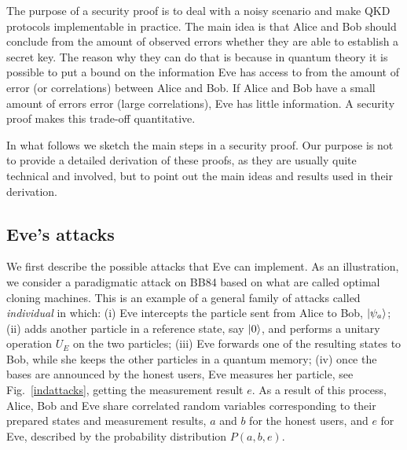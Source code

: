 \documentclass[a4paper]{article}
\begin{document}
The purpose of a security proof is to deal with a noisy scenario
and make QKD protocols implementable in practice. The main idea is
that Alice and Bob should conclude from the amount of observed
errors whether they are able to establish a secret key. The reason
why they can do that is because in quantum theory it is
possible to put a bound on the information Eve has access to from
the amount of error (or correlations) between Alice and Bob. If
Alice and Bob have a small amount of errors error (large correlations), Eve has little
information. A security proof makes this trade-off quantitative.

In what follows we sketch the main steps in a
security proof. Our purpose is not to provide a detailed
derivation of these proofs, as they are usually quite technical
and involved, but to point out the main ideas and results used in
their derivation.

\subsection{Eve's attacks}

We first describe the possible attacks that Eve can implement. 
As an illustration, we consider a paradigmatic attack on BB84 based on what are called optimal cloning machines. This is an example of a general family of attacks called \emph{individual} in which: (i) Eve intercepts the particle sent from Alice to Bob, $|\psi_a\rangle$; (ii) adds another particle in a reference state, say $|0\rangle$, and performs a unitary operation $U_E$ on the two particles; (iii) Eve forwards one of the resulting states to Bob, while she keeps the other particles in a quantum memory; (iv) once the bases are announced by the honest users, Eve measures her particle, see Fig.~\ref{indattacks}, getting the measurement result $e$. As a result of this process, Alice, Bob and Eve share correlated random variables corresponding to their prepared states and measurement results, $a$ and $b$ for the honest users, and $e$ for Eve, described by the probability distribution $P(a,b,e)$.
\end{document}
